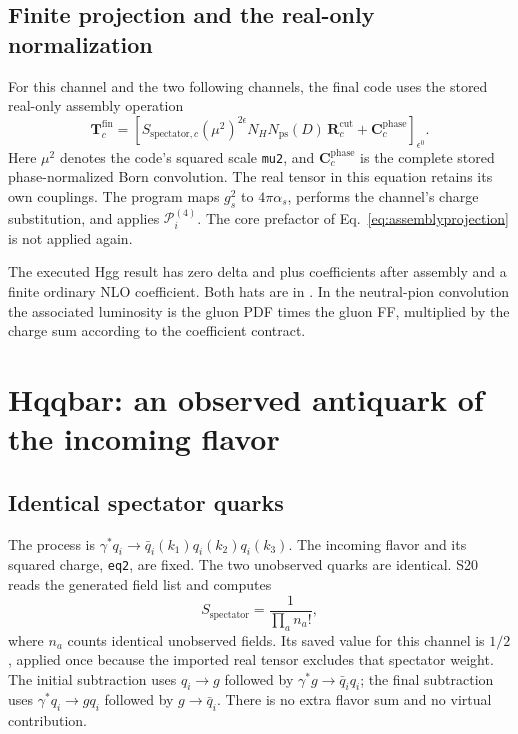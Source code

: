 \documentclass[11pt,a4paper]{article}
\newcommand{\eps}{\epsilon}
\newcommand{\cut}{\mathrm{cut}}
\begin{document}
\subsection{Finite projection and the real-only normalization}

For this channel and the two following channels, the final code uses the
stored real-only assembly operation
\begin{equation}
 \mathbf T_c^{\mathrm{fin}}=
 \left[S_{\mathrm{spectator},c}(\mu^2)^{2\eps}
 N_HN_{\mathrm{ps}}(D)\,\mathbf R_c^{\cut}
 +\mathbf C_c^{\mathrm{phase}}\right]_{\eps^0}.
 \label{eq:simpleassembly}
\end{equation}
Here $\mu^2$ denotes the code's squared scale \texttt{mu2}, and
$\mathbf C_c^{\mathrm{phase}}$ is the complete stored phase-normalized
Born convolution. The real tensor in this equation retains its own
couplings. The program maps $g_s^2$ to $4\pi\alpha_s$, performs the
channel's charge substitution, and applies $\mathcal P_i^{(4)}$.
The core prefactor of Eq.~\eqref{eq:assemblyprojection} is not applied
again.

The executed Hgg result has zero delta and plus coefficients after
assembly and a finite ordinary NLO coefficient. Both hats are in
. In the neutral-pion convolution the associated
luminosity is the gluon PDF times the gluon FF, multiplied by the
charge sum according to the coefficient contract.

\section{Hqqbar: an observed antiquark of the incoming flavor}
\label{sec:hqqbar}

\subsection{Identical spectator quarks}

The process is $\gamma^*q_i\to\bar q_i(k_1)q_i(k_2)q_i(k_3)$.
The incoming flavor and its squared charge, \texttt{eq2}, are fixed.
The two unobserved quarks are identical. S20 reads the generated field
list and computes
\begin{equation}
 S_{\mathrm{spectator}}=\frac{1}{\prod_a n_a!},
\end{equation}
where $n_a$ counts identical unobserved fields. Its saved value for this
channel is $1/2$, applied once because the imported real tensor excludes
that spectator weight.
The initial subtraction uses $q_i\to g$ followed by
$\gamma^*g\to\bar q_i q_i$; the final subtraction uses
$\gamma^*q_i\to gq_i$ followed by $g\to\bar q_i$.
There is no extra flavor sum and no virtual contribution.
\end{document}
